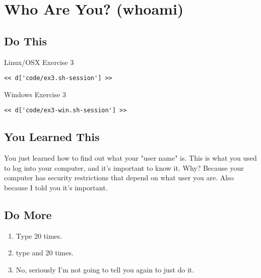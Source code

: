 \chapter{Who Are You? (whoami)}

\section{Do This}

\begin{code}{Linux/OSX Exercise 3}
\begin{Verbatim}
<< d['code/ex3.sh-session'] >>
\end{Verbatim}
\end{code}

\begin{code}{Windows Exercise 3}
\begin{Verbatim}
<< d['code/ex3-win.sh-session'] >>
\end{Verbatim}
\end{code}

\section{You Learned This}

You just learned how to find out what your "user name" is.  This is what
you used to log into your computer, and it's important to know it.  Why?
Because your computer has security restrictions that depend on what user
you are.  Also because I told you it's important.

\section{Do More}

\begin{enumerate}
\item Type  20 times.
\item type  and  20 times.
\item No, seriously I'm not going to tell you again to just do it.
\end{enumerate}

